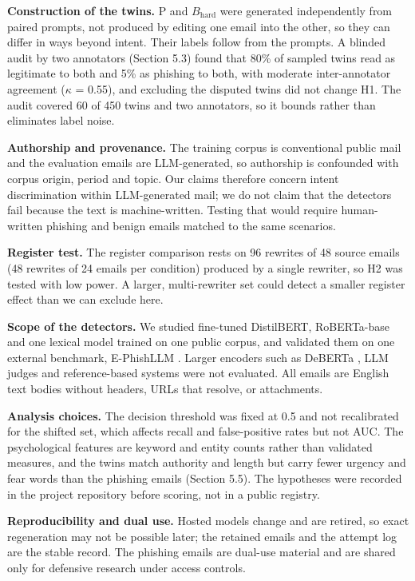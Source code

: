 \documentclass[11pt,letterpaper]{article}
\begin{document}
\textbf{Construction of the twins.} P and $B_{\mathrm{hard}}$ were generated independently from paired prompts, not produced by editing one email into the other, so they can differ in ways beyond intent. Their labels follow from the prompts. A blinded audit by two annotators (Section 5.3) found that 80\% of sampled twins read as legitimate to both and 5\% as phishing to both, with moderate inter-annotator agreement ($\kappa$ = 0.55), and excluding the disputed twins did not change H1. The audit covered 60 of 450 twins and two annotators, so it bounds rather than eliminates label noise.

\textbf{Authorship and provenance.} The training corpus is conventional public mail and the evaluation emails are LLM-generated, so authorship is confounded with corpus origin, period and topic. Our claims therefore concern intent discrimination within LLM-generated mail; we do not claim that the detectors fail because the text is machine-written. Testing that would require human-written phishing and benign emails matched to the same scenarios.

\textbf{Register test.} The register comparison rests on 96 rewrites of 48 source emails (48 rewrites of 24 emails per condition) produced by a single rewriter, so H2 was tested with low power. A larger, multi-rewriter set could detect a smaller register effect than we can exclude here.

\textbf{Scope of the detectors.} We studied fine-tuned DistilBERT, RoBERTa-base and one lexical model trained on one public corpus, and validated them on one external benchmark, E-PhishLLM \cite{pajola2025}. Larger encoders such as DeBERTa \cite{he2021}, LLM judges \cite{koide2025} and reference-based systems \cite{liu2025} were not evaluated. All emails are English text bodies without headers, URLs that resolve, or attachments.

\textbf{Analysis choices.} The decision threshold was fixed at 0.5 and not recalibrated for the shifted set, which affects recall and false-positive rates but not AUC. The psychological features are keyword and entity counts rather than validated measures, and the twins match authority and length but carry fewer urgency and fear words than the phishing emails (Section 5.5). The hypotheses were recorded in the project repository before scoring, not in a public registry.

\textbf{Reproducibility and dual use.} Hosted models change and are retired, so exact regeneration may not be possible later; the retained emails and the attempt log are the stable record. The phishing emails are dual-use material and are shared only for defensive research under access controls.
\end{document}
